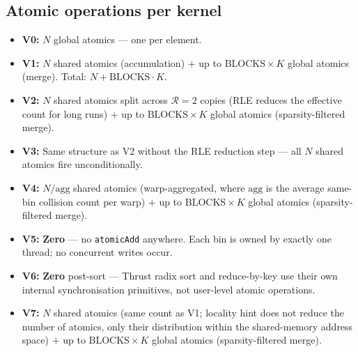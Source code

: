 \documentclass[11pt, letterpaper]{article}
\begin{document}
\subsection*{Atomic operations per kernel}

\begin{itemize}[noitemsep]
  \item \textbf{V0:} $N$ global atomics --- one per element.
  \item \textbf{V1:} $N$ shared atomics (accumulation) $+$ up to
        $\text{BLOCKS} \times K$ global atomics (merge).
        Total: $N + \text{BLOCKS} \cdot K$.
  \item \textbf{V2:} $N$ shared atomics split across $\mathcal{R}{=}2$ copies
        (RLE reduces the effective count for long runs) $+$ up to
        $\text{BLOCKS} \times K$ global atomics (sparsity-filtered merge).
  \item \textbf{V3:} Same structure as V2 without the RLE reduction step ---
        all $N$ shared atomics fire unconditionally.
  \item \textbf{V4:} $N/\text{agg}$ shared atomics (warp-aggregated, where
        $\text{agg}$ is the average same-bin collision count per warp) $+$
        up to $\text{BLOCKS} \times K$ global atomics (sparsity-filtered merge).
  \item \textbf{V5:} \textbf{Zero} --- no \texttt{atomicAdd} anywhere.
        Each bin is owned by exactly one thread; no concurrent writes occur.
  \item \textbf{V6:} \textbf{Zero} post-sort --- Thrust radix sort and
        reduce-by-key use their own internal synchronisation primitives,
        not user-level atomic operations.
  \item \textbf{V7:} $N$ shared atomics (same count as V1; locality hint
        does not reduce the number of atomics, only their distribution
        within the shared-memory address space) $+$ up to
        $\text{BLOCKS} \times K$ global atomics (sparsity-filtered merge).
\end{itemize}
\end{document}
